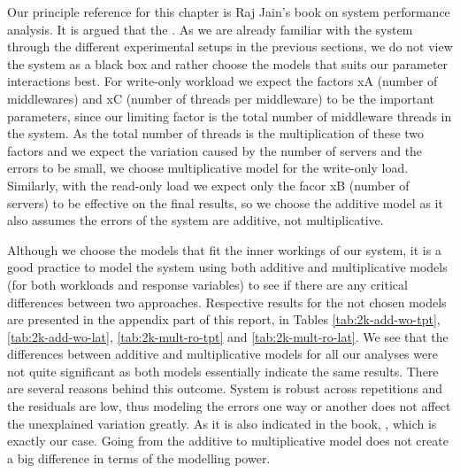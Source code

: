\documentclass[11pt,a4paper]{article}
\begin{document}
Our principle reference for this chapter is Raj Jain's book \cite{book} on system performance analysis. It is argued that the . As we are already familiar with the system through the different experimental setups in the previous sections, we do not view the system as a black box and rather choose the models that suits our parameter interactions best. For write-only workload we expect the factors xA (number of middlewares) and xC (number of threads per middleware) to be the important parameters, since our limiting factor is the total number of middleware threads in the system. As the total number of threads is the multiplication of these two factors and we expect the variation caused by the number of servers and the errors to be small, we choose multiplicative model for the write-only load. Similarly, with the read-only load we expect only the facor xB (number of servers) to be effective on the final results, so we choose the additive model as it also assumes the errors of the system are additive, not multiplicative.
\par Although we choose the models that fit the inner workings of our system, it is a good practice to model the system using both additive and multiplicative models (for both workloads and response variables) to see if there are any critical differences between two approaches. Respective results for the not chosen models are presented in the appendix part of this report, in Tables \ref{tab:2k-add-wo-tpt}, \ref{tab:2k-add-wo-lat}, \ref{tab:2k-mult-ro-tpt} and \ref{tab:2k-mult-ro-lat}. We see that the differences between additive and multiplicative models for all our analyses were not quite significant as both models essentially indicate the same results. There are several reasons behind this outcome. System is robust across repetitions and the residuals are low, thus modeling the errors one way or another does not affect the unexplained variation greatly. As it is also indicated in the book, , which is exactly our case. Going from the additive to multiplicative model does not create a big difference in terms of the modelling power.
\end{document}
